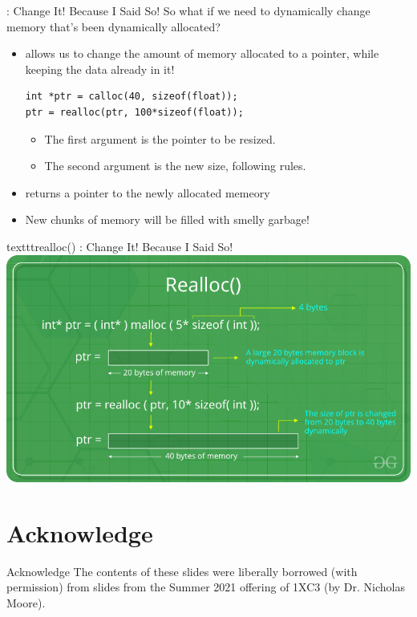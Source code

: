 \documentclass[11pt]{beamer}
\let\OldTexttt\texttt
\renewcommand{\texttt}[1]{\OldTexttt{\color{teal}{#1}}}
\begin{document}
\begin{frame}[fragile=singleslide]{\texttt{realloc()} : Change It! Because I Said So!}
So what if we need to dynamically change memory that's been dynamically allocated? 
\begin{itemize}
\item \texttt{realloc()} allows us to change the amount of memory allocated to a pointer, while keeping the data already in it! 
\begin{lstlisting}[style = C]
int *ptr = calloc(40, sizeof(float));
ptr = realloc(ptr, 100*sizeof(float));
\end{lstlisting}
\begin{itemize}
\item The first argument is the pointer to be resized.
\item The second argument is the new size, following \texttt{malloc()} rules.  
\end{itemize}
\item \texttt{realloc()} returns a pointer to the newly allocated memeory
\item New chunks of memory will be filled with smelly garbage! 
\end{itemize}
\end{frame}

\begin{frame}{texttt{realloc()} : Change It! Because I Said So!}
\center
\includegraphics[scale=0.35]{realloc-function-in-c.png}
\end{frame}


\section[Acknowledge]{Acknowledge}
\begin{frame}{Acknowledge}
\center
\vspace{8em}
The contents of these slides were liberally borrowed (with permission) from slides from the Summer 2021 offering of 1XC3 (by Dr. Nicholas Moore).  
\end{frame}
\end{document}
